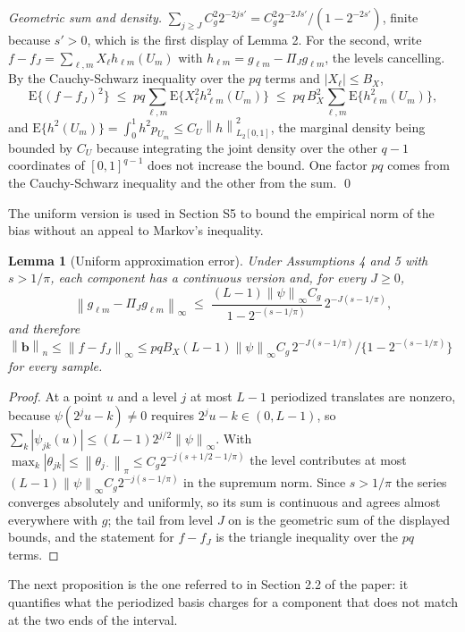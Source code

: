 \documentclass[10pt]{book}
\newtheorem{lemma}{Lemma}[section]
\theoremstyle{definition}
\newcommand{\E}{\mathrm{E}}
\newcommand{\norm}[1]{\left\lVert #1 \right\rVert}
\newcommand{\normn}[1]{\left\lVert #1 \right\rVert_{n}}
\newcommand{\cv}{\ell}
\newcommand{\md}{m}
\newcommand{\lev}{j}
\newcommand{\tsl}{k}
\newcommand{\gcomp}[2]{g_{#1#2}}
\newcommand{\wav}[2]{\psi_{#1#2}}
\newcommand{\PiJ}{\Pi_{J}}
\newcommand{\seff}{s'}
\newcommand{\bb}{\mathbf{b}}
\begin{document}
\emph{Geometric sum and density.}
$\sum_{\lev\ge J}C_g^2 2^{-2\lev\seff} = C_g^2 2^{-2J\seff}/(1-2^{-2\seff})$,
finite because $\seff > 0$, which is the first display of Lemma 2. For the
second, write $f-f_J = \sum_{\cv,\md}X_{\cv}h_{\cv\md}(U_{\md})$ with
$h_{\cv\md} = \gcomp{\cv}{\md}-\PiJ\gcomp{\cv}{\md}$, the levels cancelling.
By the Cauchy-Schwarz inequality over the $pq$ terms and
$|X_{\cv}| \le B_X$,
\[
  \E\{(f-f_J)^2\} \;\le\; pq\sum_{\cv,\md}
  \E\{X_{\cv}^2h_{\cv\md}^2(U_{\md})\}
  \;\le\; pq\,B_X^2\sum_{\cv,\md}\E\{h_{\cv\md}^2(U_{\md})\},
\]
and $\E\{h^2(U_{\md})\} = \int_0^1 h^2 p_{U_{\md}} \le C_U\norm{h}^2_{L_2[0,1]}$,
the marginal density being bounded by $C_U$ because integrating the joint
density over the other $q-1$ coordinates of $[0,1]^{q-1}$ does not increase
the bound. One factor $pq$ comes from the Cauchy-Schwarz inequality and the
other from the sum. \qed

The uniform version is used in Section S5 to bound the empirical norm of the
bias without an appeal to Markov's inequality.

\begin{lemma}[Uniform approximation error]
\label{lem:sup}
Under Assumptions 4 and 5 with $s > 1/\pi$, each component has a continuous
version and, for every $J \ge 0$,
\[
  \norm{\gcomp{\cv}{\md}-\PiJ\gcomp{\cv}{\md}}_{\infty}
  \;\le\; \frac{(L-1)\norm{\psi}_{\infty}C_g}{1-2^{-(s-1/\pi)}}\,
  2^{-J(s-1/\pi)} ,
\]
and therefore
$\normn{\bb} \le \norm{f-f_J}_{\infty} \le pq B_X(L-1)\norm{\psi}_{\infty}
C_g\,2^{-J(s-1/\pi)}/\{1-2^{-(s-1/\pi)}\}$ for every sample.
\end{lemma}

\begin{proof}
At a point $u$ and a level $\lev$ at most $L-1$ periodized translates are
nonzero, because $\psi(2^{\lev}u-\tsl)\ne0$ requires
$2^{\lev}u-\tsl \in (0,L-1)$, so
$\sum_{\tsl}|\wav{\lev}{\tsl}(u)| \le (L-1)2^{\lev/2}\norm{\psi}_{\infty}$.
With $\max_{\tsl}|\theta_{\lev\tsl}| \le \norm{\theta_{\lev\cdot}}_{\pi} \le
C_g2^{-\lev(s+1/2-1/\pi)}$ the level contributes at most
$(L-1)\norm{\psi}_{\infty}C_g2^{-\lev(s-1/\pi)}$ in the supremum norm. Since
$s > 1/\pi$ the series converges absolutely and uniformly, so its sum is
continuous and agrees almost everywhere with $g$; the tail from level $J$ on
is the geometric sum of the displayed bounds, and the statement for $f-f_J$ is
the triangle inequality over the $pq$ terms.
\end{proof}

The next proposition is the one referred to in Section 2.2 of the paper: it
quantifies what the periodized basis charges for a component that does not
match at the two ends of the interval.
\end{document}
